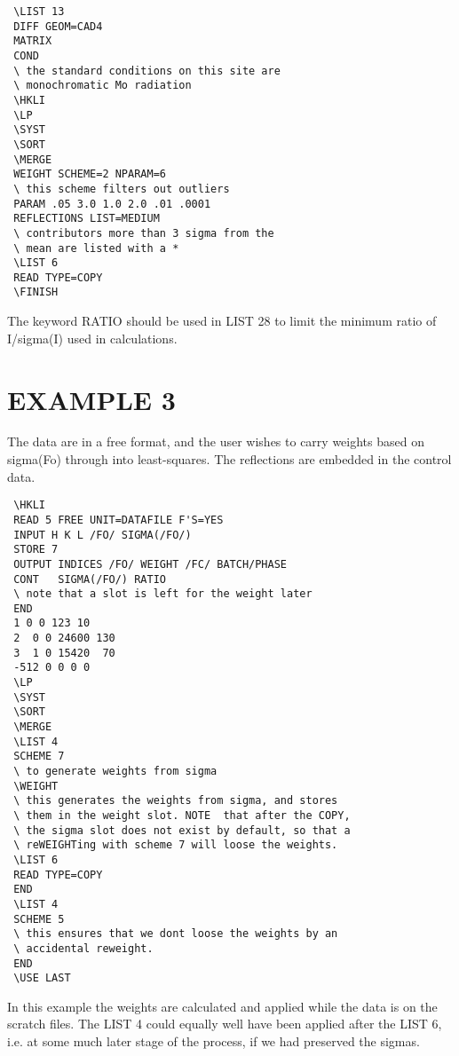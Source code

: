\documentclass[10pt,a4paper]{report}
\begin{document}
\small\begin{verbatim}
 \LIST 13
 DIFF GEOM=CAD4
 MATRIX
 COND
 \ the standard conditions on this site are 
 \ monochromatic Mo radiation
 \HKLI
 \LP
 \SYST
 \SORT
 \MERGE
 WEIGHT SCHEME=2 NPARAM=6
 \ this scheme filters out outliers
 PARAM .05 3.0 1.0 2.0 .01 .0001
 REFLECTIONS LIST=MEDIUM
 \ contributors more than 3 sigma from the 
 \ mean are listed with a *
 \LIST 6
 READ TYPE=COPY
 \FINISH
\end{verbatim}\normalsize




The keyword RATIO should be used in LIST 28 to limit the minimum ratio of
 I/sigma(I) used in calculations.



\section{EXAMPLE 3}


The data are in a free format, and the user wishes to carry weights 
 based on sigma(Fo)
 through into least-squares. The reflections are embedded in the control data.

\small\begin{verbatim}
 \HKLI
 READ 5 FREE UNIT=DATAFILE F'S=YES
 INPUT H K L /FO/ SIGMA(/FO/)
 STORE 7
 OUTPUT INDICES /FO/ WEIGHT /FC/ BATCH/PHASE 
 CONT   SIGMA(/FO/) RATIO
 \ note that a slot is left for the weight later
 END
 1 0 0 123 10
 2  0 0 24600 130
 3  1 0 15420  70
 -512 0 0 0 0
 \LP
 \SYST
 \SORT
 \MERGE
 \LIST 4
 SCHEME 7
 \ to generate weights from sigma
 \WEIGHT
 \ this generates the weights from sigma, and stores 
 \ them in the weight slot. NOTE  that after the COPY, 
 \ the sigma slot does not exist by default, so that a 
 \ reWEIGHTing with scheme 7 will loose the weights.
 \LIST 6
 READ TYPE=COPY
 END
 \LIST 4
 SCHEME 5
 \ this ensures that we dont loose the weights by an 
 \ accidental reweight.
 END
 \USE LAST
\end{verbatim}\normalsize




In this example the weights are calculated and applied while the data is
 on the scratch files. The LIST 4 could equally well have been applied after
 the LIST 6, i.e. at some much later stage of the process, if we had preserved
 the sigmas.
\end{document}
